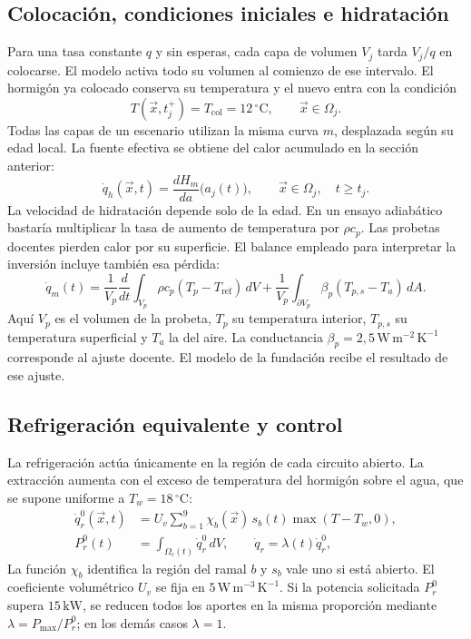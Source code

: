 \subsection{Colocación, condiciones iniciales e hidratación}
Para una tasa constante $q$ y sin esperas, cada capa de volumen $V_j$ tarda $V_j/q$ en colocarse. El modelo activa todo su volumen al comienzo de ese intervalo. El hormigón ya colocado conserva su temperatura y el nuevo entra con la condición
\begin{equation}
  T(\vec{x},t_j^+)=T_{\mathrm{col}}=12\,^{\circ}\mathrm{C},
  \qquad \vec{x}\in\Omega_j.
  \label{eq:inicial-colocacion}
\end{equation}
Todas las capas de un escenario utilizan la misma curva $m$, desplazada según su edad local. La fuente efectiva se obtiene del calor acumulado en la sección anterior:
\begin{equation}
  \dot q_h(\vec{x},t)=\frac{dH_m}{da}\bigl(a_j(t)\bigr),
  \qquad \vec{x}\in\Omega_j,\quad t\geq t_j.
  \label{eq:fuente-edad}
\end{equation}
La velocidad de hidratación depende solo de la edad. En un ensayo adiabático bastaría multiplicar la tasa de aumento de temperatura por $\rho c_p$. Las probetas docentes pierden calor por su superficie. El balance empleado para interpretar la inversión incluye también esa pérdida:
\begin{equation}
  \dot q_m(t)=\frac{1}{V_p}\frac{d}{dt}
       \int_{V_p}\rho c_p(T_p-T_{\mathrm{ref}})\,dV
       +\frac{1}{V_p}\int_{\partial V_p}\beta_p(T_{p,s}-T_a)\,dA.
  \label{eq:balance-probeta}
\end{equation}
Aquí $V_p$ es el volumen de la probeta, $T_p$ su temperatura interior, $T_{p,s}$ su temperatura superficial y $T_a$ la del aire. La conductancia $\beta_p=2{,}5\,\mathrm{W\,m^{-2}\,K^{-1}}$ corresponde al ajuste docente. El modelo de la fundación recibe el resultado de ese ajuste.

\subsection{Refrigeración equivalente y control}
La refrigeración actúa únicamente en la región de cada circuito abierto. La extracción aumenta con el exceso de temperatura del hormigón sobre el agua, que se supone uniforme a $T_w=18\,^\circ\mathrm C$:
\begin{equation}\begin{aligned}
  \dot q_r^0(\vec{x},t)&=U_v\sum_{b=1}^{9}
       \chi_b(\vec{x})\,s_b(t)\max(T-T_w,0),\\
  P_r^0(t)&=\int_{\Omega_c(t)}\dot q_r^0\,dV,
  \qquad \dot q_r=\lambda(t)\dot q_r^0,
  \end{aligned}\label{eq:extraccion-equivalente}\end{equation}
La función $\chi_b$ identifica la región del ramal $b$ y $s_b$ vale uno si está abierto. El coeficiente volumétrico $U_v$ se fija en $5\,\mathrm{W\,m^{-3}\,K^{-1}}$. Si la potencia solicitada $P_r^0$ supera $15\,\mathrm{kW}$, se reducen todos los aportes en la misma proporción mediante $\lambda=P_{\max}/P_r^0$; en los demás casos $\lambda=1$.

